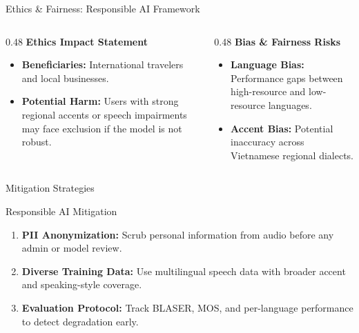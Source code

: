 \documentclass{beamer}
\begin{document}
\begin{frame}[t]{Ethics \& Fairness: Responsible AI Framework}
\small

\begin{columns}[T,onlytextwidth]
    \begin{column}{0.48\textwidth}
        \textbf{Ethics Impact Statement}
        \begin{itemize}\setlength{\itemsep}{4pt}
            \item \textbf{Beneficiaries:} International travelers and local businesses.
            \item \textbf{Potential Harm:} Users with strong regional accents or speech impairments may face exclusion if the model is not robust.
        \end{itemize}
    \end{column}

    \begin{column}{0.48\textwidth}
        \textbf{Bias \& Fairness Risks}
        \begin{itemize}\setlength{\itemsep}{4pt}
            \item \textbf{Language Bias:} Performance gaps between high-resource and low-resource languages.
            \item \textbf{Accent Bias:} Potential inaccuracy across Vietnamese regional dialects.
        \end{itemize}
    \end{column}
\end{columns}

\end{frame}

\begin{frame}[t]{Mitigation Strategies}
\small

\begin{block}{Responsible AI Mitigation}
\begin{enumerate}\setlength{\itemsep}{5pt}
    \item \textbf{PII Anonymization:}
    Scrub personal information from audio before any admin or model review.

    \item \textbf{Diverse Training Data:}
    Use multilingual speech data with broader accent and speaking-style coverage.

    \item \textbf{Evaluation Protocol:}
    Track BLASER, MOS, and per-language performance to detect degradation early.
\end{enumerate}
\end{block}

\end{frame}
\end{document}

